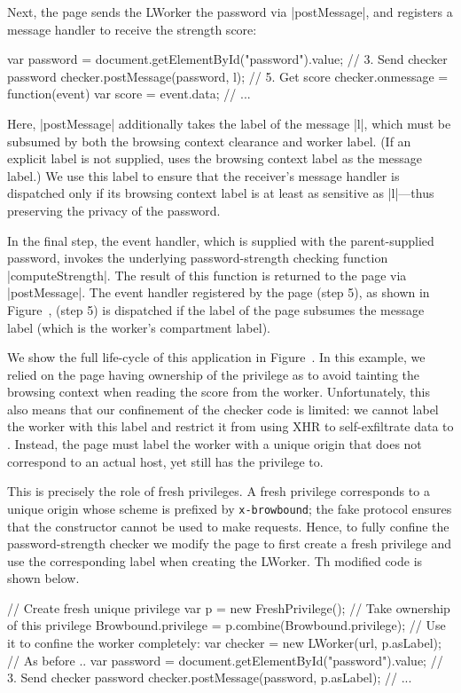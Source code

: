Next, the page sends the LWorker the
password via \js|postMessage|, and registers a message handler to
receive the strength score:
\begin{jscode}
var password = 
 document.getElementById("password").value;
// 3. Send checker password 
checker.postMessage(password, l);
// 5. Get score
checker.onmessage = function(event) {
  var score = event.data; 
  // ...
}
\end{jscode}
Here, \js|postMessage| additionally takes the label of the message
\js|l|, which must be subsumed by both the browsing context clearance
and worker label.
%
(If an explicit label is not supplied, \sys{} uses the browsing
context label as the message label.)
%
We use this label to ensure that the receiver's message handler is
dispatched only if its browsing context label is at least as sensitive
as \js|l|---thus preserving the privacy of the password.

In the final step, the event handler, which is supplied with the
parent-supplied password, invokes the underlying password-strength
checking function \js|computeStrength|.
%
The result of this function is returned to the page via
\js|postMessage|.
%
The event handler registered by the page 
\iffigures
\ifcompletefigures
(step 5), as shown in Figure~, 
\fi
\else
(step 5)
\fi
is dispatched if the label of
the page subsumes the message label (which is the worker's compartment
label).

\iffigures
\ifcompletefigures
We show the full life-cycle of this application in
Figure~.
\fi
\fi
%
In this example, we relied on the page having ownership of the
 privilege as to avoid tainting the browsing
context when reading the score from the worker.
%
Unfortunately, this also means that our confinement of the checker
code is limited: we cannot label the worker with this label and
restrict it from using XHR to self-exfiltrate data to
.
%
Instead, the page must label the worker with a unique origin that does
not correspond to an actual host, yet still has the privilege to.

This is precisely the role of fresh privileges.
%
A fresh privilege corresponds to a unique origin whose scheme is
prefixed by \texttt{x-browbound}; the fake protocol ensures that the
\xhr{} constructor cannot be used to make requests.
%
Hence, to fully confine the password-strength checker we modify the
 page to first create a fresh privilege and use the
corresponding label when creating the LWorker.
%
Th modified code is shown below.
\begin{jscode}
// Create fresh unique privilege
var p = new FreshPrivilege();
// Take ownership of this privilege
Browbound.privilege = p.combine(Browbound.privilege);
// Use it to confine the worker completely:
var checker = new LWorker(url, p.asLabel);
// As before ..
var password = 
 document.getElementById("password").value;
// 3. Send checker password 
checker.postMessage(password, p.asLabel);
// ...
\end{jscode}

